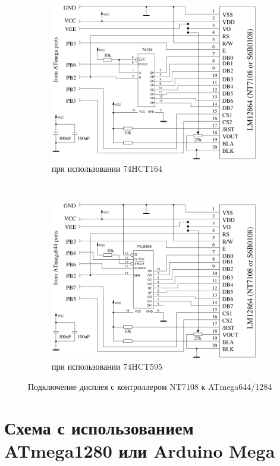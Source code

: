\begin{figure}[H]
  \begin{subfigure}[b]{.5\textwidth}
    \centering
    \includegraphics[width=.88\textwidth]{../FIG/ST7108serial164_644.pdf}
    \caption{при использовании 74HCT164}
  \end{subfigure}
  ~
  \begin{subfigure}[b]{.5\textwidth}
    \centering
    \includegraphics[width=.88\textwidth]{../FIG/ST7108serial595_644.pdf}
    \caption{при использовании 74HCT595}
  \end{subfigure}
  \caption{Подключение дисплея с контроллером NT7108 к ATmega644/1284}
  \label{fig:NT7108lcd_644}
\end{figure}

\section{Схема с использованием ATmega1280 или Arduino Mega}

